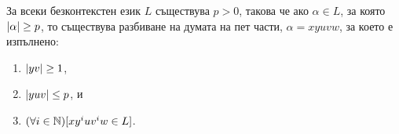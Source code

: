 \begin{important}
  \begin{lemma}
    \label{lem:pumping-context} 
    За всеки безконтекстен език $L$ съществува $p>0$, такова
    че ако $\alpha\in L$, за която $\vert{\alpha}\vert \geq p$, то съществува разбиване на думата на пет части, $\alpha=xyuvw$,
    за което е изпълнено:
    \begin{enumerate}[1)]
    \item
      $\vert{yv}\vert\geq 1$,
    \item
      $\vert{yuv}\vert\leq p$, и
    \item
      $(\forall i\in\mathbb{N})[xy^iuv^iw\in L]$.
    \end{enumerate}
  \end{lemma}
\end{important}
